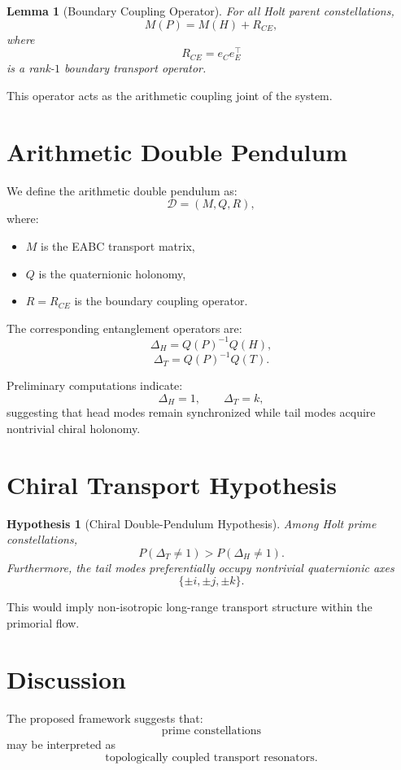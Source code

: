 \documentclass[11pt]{article}
\newtheorem{lemma}{Lemma}
\newtheorem{hypothesis}{Hypothesis}
\begin{document}
	\begin{lemma}[Boundary Coupling Operator]
		For all Holt parent constellations,
		\[
		M(P)=M(H)+R_{CE},
		\]
		where
		\[
		R_{CE}=e_Ce_E^\top
		\]
		is a rank-$1$ boundary transport operator.
	\end{lemma}
	
	This operator acts as the arithmetic coupling joint of the system.
	
	\section{Arithmetic Double Pendulum}
	
	We define the arithmetic double pendulum as:
	\[
	\mathcal D=(M,Q,R),
	\]
	where:
	\begin{itemize}
		\item $M$ is the EABC transport matrix,
		\item $Q$ is the quaternionic holonomy,
		\item $R=R_{CE}$ is the boundary coupling operator.
	\end{itemize}
	
	The corresponding entanglement operators are:
	\[
	\Delta_H=Q(P)^{-1}Q(H),
	\]
	\[
	\Delta_T=Q(P)^{-1}Q(T).
	\]
	
	Preliminary computations indicate:
	\[
	\Delta_H=1,
	\qquad
	\Delta_T=k,
	\]
	suggesting that head modes remain synchronized while tail modes acquire nontrivial chiral holonomy.
	
	\section{Chiral Transport Hypothesis}
	
	\begin{hypothesis}[Chiral Double-Pendulum Hypothesis]
		Among Holt prime constellations,
		\[
		P(\Delta_T\neq 1)
		>
		P(\Delta_H\neq 1).
		\]
		Furthermore, the tail modes preferentially occupy nontrivial quaternionic axes
		\[
		\{\pm i,\pm j,\pm k\}.
		\]
	\end{hypothesis}
	
	This would imply non-isotropic long-range transport structure within the primorial flow.
	
	\section{Discussion}
	
	The proposed framework suggests that:
	\[
	\text{prime constellations}
	\]
	may be interpreted as
	\[
	\text{topologically coupled transport resonators}.
	\]
	
\end{document}
